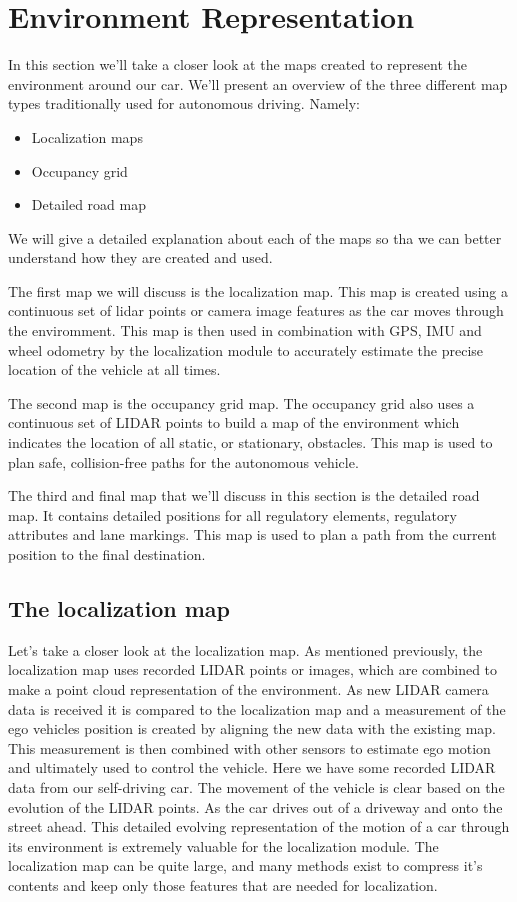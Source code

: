 \section{Environment Representation}
\label{environment_representation}

In this section we'll take a closer look at the maps created to represent the environment around our car. We'll present an overview of the three
different map types traditionally used for autonomous driving. Namely:

\begin{itemize}
\item Localization maps 
\item Occupancy grid
\item Detailed road map
\end{itemize}

We will give  a detailed explanation about each of the maps so tha we can better understand how they are created
and used. 

The first map we will discuss is the localization map. This map is created using
a continuous set of lidar points or camera image features as the car
moves through the enviromment. This map is then used in
combination with GPS, IMU and wheel odometry by the localization module to accurately estimate the precise
location of the vehicle at all times. 

The second map is the occupancy grid map. The occupancy grid also uses a continuous
set of LIDAR points to build a map of the environment which indicates
the location of all static, or stationary, obstacles. This map is used to plan safe,
collision-free paths for the autonomous vehicle. 

The third and final map that we'll discuss
in this section is the detailed road map. It contains detailed positions for all regulatory elements,
regulatory attributes and lane markings. This map is used to plan a path from the
current position to the final destination. 


\subsection{The localization map}
\label{localization_map}

Let's take a closer look
at the localization map. As mentioned previously, the localization map uses
recorded LIDAR points or images, which are combined to make a point
cloud representation of the environment. As new LIDAR camera data is received it
is compared to the localization map and a measurement of the ego vehicles
position is created by aligning the new data with the existing map. This measurement is then combined with
other sensors to estimate ego motion and ultimately used to control the vehicle. Here we have some recorded LIDAR
data from our self-driving car. The movement of the vehicle is clear based
on the evolution of the LIDAR points. As the car drives out of a driveway and
onto the street ahead. This detailed evolving representation
of the motion of a car through its environment is extremely valuable for
the localization module. The localization map can be quite large,
and many methods exist to compress it's contents and keep only those features
that are needed for localization.


